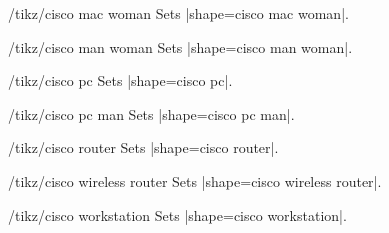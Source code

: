 \documentclass[a4paper]{ltxdoc}
\begin{document}
\begin{stylekey}{/tikz/cisco mac woman}
Sets |shape={cisco mac woman}|.
\begin{codeexample}[preamble={\usetikzlibrary{shapes.cisco.macwoman}}]
\end{codeexample}
\end{stylekey}

\begin{stylekey}{/tikz/cisco man woman}
Sets |shape={cisco man woman}|.
\begin{codeexample}[preamble={\usetikzlibrary{shapes.cisco.manwoman}}]
\end{codeexample}
\end{stylekey}

\begin{stylekey}{/tikz/cisco pc}
Sets |shape={cisco pc}|.
\begin{codeexample}[preamble={\usetikzlibrary{shapes.cisco.pc}}]
\tikz{\node[cisco pc] {};}
\end{codeexample}
\end{stylekey}

\begin{stylekey}{/tikz/cisco pc man}
Sets |shape={cisco pc man}|.
\begin{codeexample}[preamble={\usetikzlibrary{shapes.cisco.pcman}}]
\end{codeexample}
\end{stylekey}

\begin{stylekey}{/tikz/cisco router}
Sets |shape={cisco router}|.
\begin{codeexample}[preamble={\usetikzlibrary{shapes.cisco.router}}]
\end{codeexample}
\end{stylekey}

\begin{stylekey}{/tikz/cisco wireless router}
Sets |shape={cisco wireless router}|.
\begin{codeexample}[preamble={\usetikzlibrary{shapes.cisco.wirelessrouter}}]
\end{codeexample}
\end{stylekey}

\begin{stylekey}{/tikz/cisco workstation}
Sets |shape={cisco workstation}|.
\begin{codeexample}[preamble={\usetikzlibrary{shapes.cisco.workstation}}]
\end{codeexample}
\end{stylekey}
\end{document}
